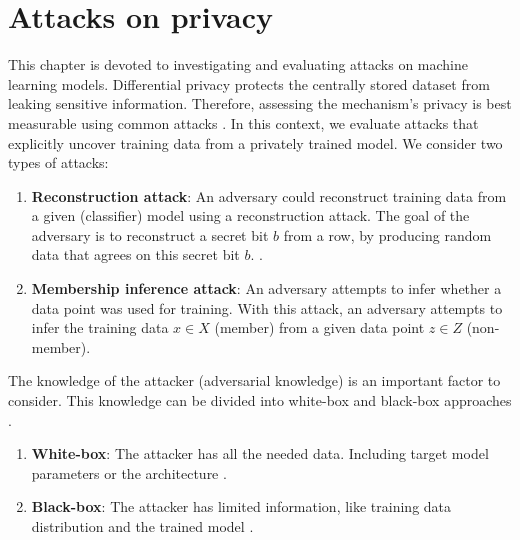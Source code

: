 \chapter{Attacks on privacy} \label{section: MIA}
This chapter is devoted to investigating and evaluating attacks on machine learning models.
Differential privacy protects the centrally stored dataset from leaking sensitive information.
Therefore, assessing the mechanism's privacy is best measurable using common attacks \citep{jayaraman_evaluating_nodate}.
In this context, we evaluate attacks that explicitly uncover training data from a privately trained model.
We consider two types of attacks:
\begin{enumerate}
  \item \textbf{Reconstruction attack}:  An adversary could reconstruct training data from a given (classifier) model using a reconstruction attack. The goal of the adversary is to reconstruct a secret bit $b$ from a row, by producing random data that agrees on this secret bit $b$. \citep{dwork_exposed_2017}.
  \item \textbf{Membership inference attack}: An adversary attempts to infer whether a data point was used for training. With this attack, an adversary attempts to infer the training data $x \in X$ (member) from a given data point $z \in Z$ (non-member).

\end{enumerate}
The knowledge of the attacker (adversarial knowledge) is an important factor to consider.
This knowledge can be divided into white-box and black-box approaches \citep{hu_membership_2022}.
\begin{enumerate}
  \item \textbf{White-box}: The attacker has all the needed data. Including target model parameters or the architecture \citep{hu_membership_2022}.
  \item \textbf{Black-box}: The attacker has limited information, like training data distribution and the trained model \citep{hu_membership_2022}.
\end{enumerate}
